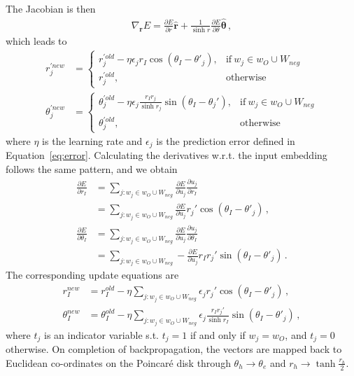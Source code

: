 \documentclass[sigconf, review]{acmart}
\begin{document}
The Jacobian is then
\begin{align}
\nabla  _\mathbf{r} E = \frac{\partial E}{\partial r} \mathbf{\hat{r}} + \frac{1}{\sinh r}\frac{\partial E}{\partial \theta} \mathbf{\hat{\theta}}\,,
\end{align}
which leads to
\begin{align}
r_j^{'new} &= 
\begin{cases} 
r_j^{'old} - \eta \epsilon_j r_I \cos(\theta_I - \theta'_j), & \text{if}\ w_j \in w_O\cup W_{neg}\\ 
r_j^{'old}, & \text{otherwise} 
\end{cases} \\
\theta_j^{'new} &= 
\begin{cases} 
\theta_j^{'old} - \eta \epsilon_j \frac{r_Ir_j}{\sinh{r_j}}\sin(\theta_I - \theta_j') , & \text{if}\ w_j \in w_O\cup W_{neg}\\ 
\theta_j^{'old}, & \text{otherwise} 
\end{cases} 
\end{align}
where $\eta$ is the learning rate and $\epsilon_j$ is the prediction error defined in Equation~\eqref{eq:error}. Calculating the derivatives w.r.t. the input embedding follows the same pattern, and we obtain
\begin{align}
\frac{\partial E}{\partial r_I} &= \sum_{j : w_j \in w_O \cup W_{neg}} \frac{\partial E}{\partial u_j}\frac{\partial u_j}{\partial r_I} \\
&= \sum_{j : w_j \in w_O \cup W_{neg}} \frac{\partial E}{\partial u_j} r_j' \cos(\theta_I - \theta'_j) \,,\\
\frac{\partial E}{\partial \theta_I} &= \sum_{j : w_j \in w_O \cup W_{neg}} \frac{\partial E}{\partial u_j}\frac{\partial u_j}{\partial \theta_I} \\
&= \sum_{j : w_j \in w_O \cup W_{neg}} -\frac{\partial E}{\partial u_j} r_I r_j' \sin(\theta_I - \theta'_j)\,. 
\end{align}
The corresponding update equations are
\begin{align}
r_I^{new} &= 
r_I^{old} - \eta \sum_{j : w_j \in w_O \cup W_{neg}} \epsilon_j r_j' \cos(\theta_I - \theta'_j)\,,\\ 
\theta_I^{new} &= 
\theta_I^{old} - \eta \sum_{j : w_j \in w_O \cup W_{neg}} \epsilon_j \frac{r_I r_j'}{\sinh r_I} \sin(\theta_I - \theta'_j)\,,
\end{align}
%
where $t_j$ is an indicator variable s.t. $t_j=1$ if and only if $w_j=w_O$, and $t_j = 0$ otherwise. On completion of backpropagation, the vectors are mapped back to Euclidean co-ordinates on the Poincar\'e disk through $\theta_h \to \theta_e$ and $r_h \to \tanh \frac{r_h}{2}$.
\end{document}
